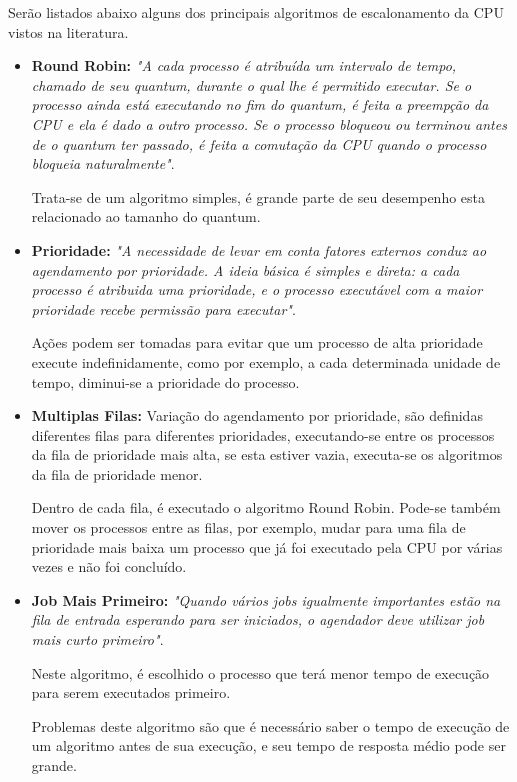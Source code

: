 Serão listados abaixo alguns dos principais algoritmos de escalonamento da CPU vistos na literatura.

\begin{itemize}
	\item \textbf{Round Robin:} \textit{"A cada processo é atribuída um intervalo de tempo, chamado de seu quantum, durante o qual lhe é permitido executar. Se o processo ainda está executando no fim do quantum, é feita a preempção da CPU e ela é dado a outro processo. Se o processo bloqueou ou terminou antes de o quantum ter passado, é feita a comutação da CPU quando o processo bloqueia naturalmente"}. \citep[p.70]{tanenbaum2009sistemas}
	
	Trata-se de um algoritmo simples, é grande parte de seu desempenho esta relacionado ao tamanho do quantum.

	\item \textbf{Prioridade:} \textit{"A necessidade de levar em conta fatores externos conduz ao agendamento por prioridade. A ideia básica é simples e direta: a cada processo é atribuida uma prioridade, e o processo executável com a maior prioridade recebe permissão para executar"}. \citep[p.71]{tanenbaum2009sistemas}
	
	Ações podem ser tomadas para evitar que um processo de alta prioridade execute indefinidamente, como por exemplo, a cada determinada unidade de tempo, diminui-se a prioridade do processo.
	
	\item \textbf{Multiplas Filas:} Variação do agendamento por prioridade, são definidas diferentes filas para diferentes prioridades, executando-se entre os processos da fila de prioridade mais alta, se esta estiver vazia, executa-se os algoritmos da fila de prioridade menor.
	
	Dentro de cada fila, é executado o algoritmo Round Robin.
	Pode-se também mover os processos entre as filas, por exemplo, mudar para uma fila de prioridade mais baixa um processo que já foi executado pela CPU por várias vezes e não foi concluído.
	
	\item \textbf{Job Mais Primeiro:} \textit{"Quando vários jobs igualmente importantes estão na fila de entrada esperando para ser iniciados, o agendador deve utilizar job mais curto primeiro"}. \citep[p.72]{tanenbaum2009sistemas}
	
	Neste algoritmo, é escolhido o processo que terá menor tempo de execução para serem executados primeiro.
	
	Problemas deste algoritmo são que é necessário saber o tempo de execução de um algoritmo antes de sua execução, e seu tempo de resposta médio pode ser grande. 
\end{itemize}


